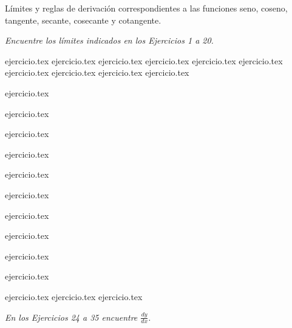 
Límites y reglas de derivación correspondientes a las funciones seno, coseno, tangente, secante, cosecante y cotangente.

\noindent \textit{Encuentre los límites indicados en los Ejercicios 1 a 20.}

\begin{enumerate}
    \begin{minipage}{0.45\textwidth}
    {ejercicio.tex}
    {ejercicio.tex}
    {ejercicio.tex}
    {ejercicio.tex}
    {ejercicio.tex}
    {ejercicio.tex}
    {ejercicio.tex}
    {ejercicio.tex}
    {ejercicio.tex}
    {ejercicio.tex}
    \end{minipage}%
    \begin{minipage}{0.45\textwidth}
    \setcounter{enumi}{1}
    {ejercicio.tex}
    \addtocounter{enumi}{1}
    {ejercicio.tex}
    \addtocounter{enumi}{1}
    {ejercicio.tex}
    \addtocounter{enumi}{1}
    {ejercicio.tex}
    \addtocounter{enumi}{1}
    {ejercicio.tex}
    \addtocounter{enumi}{1}
    {ejercicio.tex}
    \addtocounter{enumi}{1}
    {ejercicio.tex}
    \addtocounter{enumi}{1}
    {ejercicio.tex}
    \addtocounter{enumi}{1}
    {ejercicio.tex}
    \addtocounter{enumi}{1}
    {ejercicio.tex}
    \end{minipage}

    \setcounter{enumi}{20}
    {ejercicio.tex}
    {ejercicio.tex}
    {ejercicio.tex}
\end{enumerate}

\noindent \textit{En los Ejercicios 24 a 35 encuentre $\displaystyle \frac{dy}{dx}$.}

